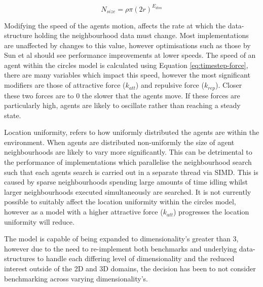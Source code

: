     \begin{equation}\label{eq:neighbourhood-size}
        N_{size} = \rho \pi (2r)^{E_{dim}}
    \end{equation}
      
    Modifying the speed of the agents motion, affects the rate at which the data-structure holding the neighbourhood data must change. Most implementations are unaffected by changes to this value, however optimisations such as those by Sun et al\cite{HY*15} should see performance improvements at lower speeds. The speed of an agent within the circles model is calculated using Equation \ref{eq:timestep-force}, there are many variables which impact this speed, however the most significant modifiers are those of attractive force ($k_{att}$) and repulsive force ($k_{rep}$). Closer these two forces are to $0$ the slower that the agents move. If these forces are particularly high, agents are likely to oscillate rather than reaching a steady state.
    
    Location uniformity, refers to how uniformly distributed the agents are within the environment. When agents are distributed non-uniformly the size of agent neighbourhoods are likely to vary more significantly. This can be detrimental to the performance of implementations which parallelise the neighbourhood search such that each agents search is carried out in a separate thread via SIMD. This is caused by sparse neighbourhoods spending large amounts of time idling whilst larger neighbourhoods executed simultaneously are searched. It is not currently possible to suitably affect the location uniformity within the circles model, however as a model with a higher attractive force ($k_{att}$) progresses the location uniformity will reduce.
    
    The model is capable of being expanded to dimensionality's greater than 3, however due to the need to re-implement both benchmarks and underlying data-structures to handle each differing level of dimensionality and the reduced interest outside of the 2D and 3D domains, the decision has been to not consider benchmarking across varying dimensionality's.